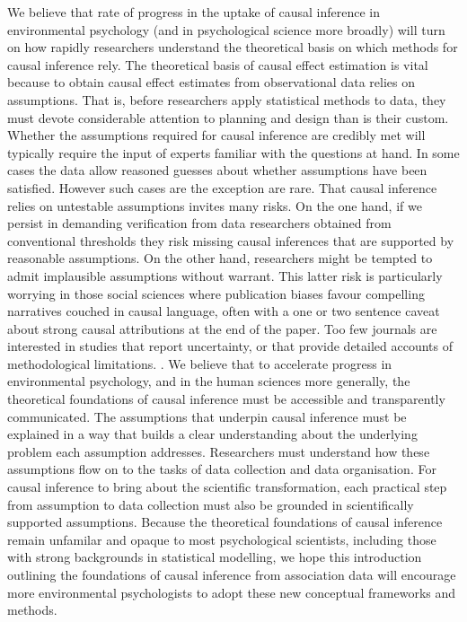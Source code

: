 \documentclass[
  singlecolumn]{article}
\begin{document}
We believe that rate of progress in the uptake of causal inference in
environmental psychology (and in psychological science more broadly)
will turn on how rapidly researchers understand the theoretical basis on
which methods for causal inference rely. The theoretical basis of causal
effect estimation is vital because to obtain causal effect estimates
from observational data relies on assumptions. That is, before
researchers apply statistical methods to data, they must devote
considerable attention to planning and design than is their custom.
Whether the assumptions required for causal inference are credibly met
will typically require the input of experts familiar with the questions
at hand. In some cases the data allow reasoned guesses about whether
assumptions have been satisfied. However such cases are the exception
are rare. That causal inference relies on untestable assumptions invites
many risks. On the one hand, if we persist in demanding verification
from data researchers obtained from conventional thresholds they risk
missing causal inferences that are supported by reasonable assumptions.
On the other hand, researchers might be tempted to admit implausible
assumptions without warrant. This latter risk is particularly worrying
in those social sciences where publication biases favour compelling
narratives couched in causal language, often with a one or two sentence
caveat about strong causal attributions at the end of the paper. Too few
journals are interested in studies that report uncertainty, or that
provide detailed accounts of methodological limitations. . We believe
that to accelerate progress in environmental psychology, and in the
human sciences more generally, the theoretical foundations of causal
inference must be accessible and transparently communicated. The
assumptions that underpin causal inference must be explained in a way
that builds a clear understanding about the underlying problem each
assumption addresses. Researchers must understand how these assumptions
flow on to the tasks of data collection and data organisation. For
causal inference to bring about the scientific transformation, each
practical step from assumption to data collection must also be grounded
in scientifically supported assumptions. Because the theoretical
foundations of causal inference remain unfamilar and opaque to most
psychological scientists, including those with strong backgrounds in
statistical modelling, we hope this introduction outlining the
foundations of causal inference from association data will encourage
more environmental psychologists to adopt these new conceptual
frameworks and methods.
\end{document}
